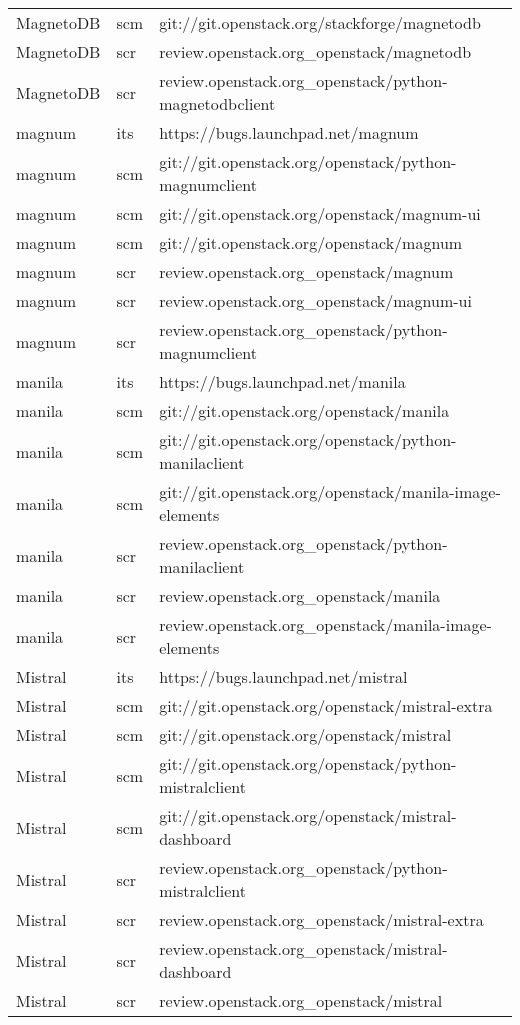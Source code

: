 \begin{center}
\begin{longtable}{|p{4cm}|p{1cm}|p{10cm}|}
MagnetoDB&scm&git://git.openstack.org/stackforge/magnetodb\\ 
MagnetoDB&scr&review.openstack.org\_openstack/magnetodb\\ 
MagnetoDB&scr&review.openstack.org\_openstack/python-magnetodbclient\\ 
magnum&its&https://bugs.launchpad.net/magnum\\ 
magnum&scm&git://git.openstack.org/openstack/python-magnumclient\\ 
magnum&scm&git://git.openstack.org/openstack/magnum-ui\\ 
magnum&scm&git://git.openstack.org/openstack/magnum\\ 
magnum&scr&review.openstack.org\_openstack/magnum\\ 
magnum&scr&review.openstack.org\_openstack/magnum-ui\\ 
magnum&scr&review.openstack.org\_openstack/python-magnumclient\\ 
manila&its&https://bugs.launchpad.net/manila\\ 
manila&scm&git://git.openstack.org/openstack/manila\\ 
manila&scm&git://git.openstack.org/openstack/python-manilaclient\\ 
manila&scm&git://git.openstack.org/openstack/manila-image-elements\\ 
manila&scr&review.openstack.org\_openstack/python-manilaclient\\ 
manila&scr&review.openstack.org\_openstack/manila\\ 
manila&scr&review.openstack.org\_openstack/manila-image-elements\\ 
Mistral&its&https://bugs.launchpad.net/mistral\\ 
Mistral&scm&git://git.openstack.org/openstack/mistral-extra\\ 
Mistral&scm&git://git.openstack.org/openstack/mistral\\ 
Mistral&scm&git://git.openstack.org/openstack/python-mistralclient\\ 
Mistral&scm&git://git.openstack.org/openstack/mistral-dashboard\\ 
Mistral&scr&review.openstack.org\_openstack/python-mistralclient\\ 
Mistral&scr&review.openstack.org\_openstack/mistral-extra\\ 
Mistral&scr&review.openstack.org\_openstack/mistral-dashboard\\ 
Mistral&scr&review.openstack.org\_openstack/mistral\\ 

\end{longtable}
\end{center}
